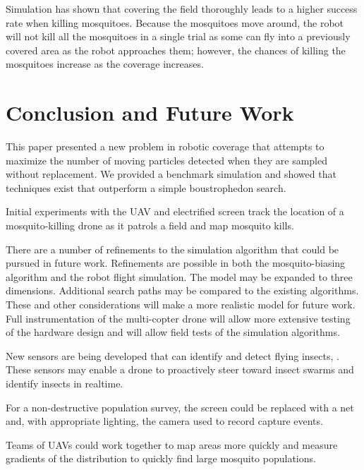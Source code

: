 \documentclass[letterpaper, 10 pt, conference]{ieeeconf}  %
\begin{document}
Simulation has shown that covering the field thoroughly leads to a higher success rate when killing mosquitoes.  Because the mosquitoes move around, the robot will not kill all the mosquitoes in a single trial as some can fly into a previously covered area as the robot approaches them; however, the chances of killing the mosquitoes increase as the coverage increases.

\section{Conclusion and Future Work}

This paper presented a new problem in robotic coverage that attempts to maximize the number of moving particles detected when they are sampled without replacement.  We provided a benchmark simulation and showed that techniques exist that outperform a simple boustrophedon search.

Initial experiments with the UAV and electrified screen track the location of a mosquito-killing drone as it patrols a field and map mosquito kills.  

There are a number of refinements to the simulation algorithm that could be pursued in future work.  Refinements are possible in both the mosquito-biasing algorithm and the robot flight simulation.  The model may be expanded to three dimensions.  Additional search paths may be compared to the existing algorithms.  These and other considerations will make a more realistic model for future work.  Full instrumentation of the multi-copter drone will allow more extensive testing of the hardware design and will allow field tests of the simulation algorithms.

New sensors are being developed that can identify and detect flying insects, \cite{chen2014flying}.  These sensors may enable a drone to proactively steer toward insect swarms and identify insects in realtime.

For a non-destructive population survey, the screen could be replaced with a net and, with appropriate lighting, the camera used to record capture events.

Teams of UAVs could work together to map areas more quickly and measure gradients of the distribution to quickly find large mosquito populations.




\end{document}
